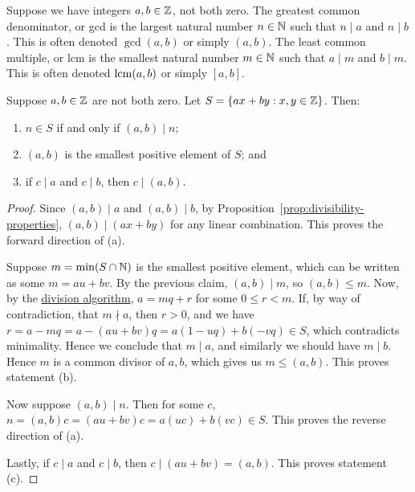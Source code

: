 \begin{definition}
    Suppose we have integers \(a,b \in \mathbb{Z}\), not both zero.
    The greatest common denominator, or gcd
    is the largest natural number \(n \in \mathbb{N}\) such that \(n \mid a\) and \(n \mid b\).
    This is often denoted \(\gcd(a,b)\) or simply \((a,b)\).
    The least common multiple, or lcm
    is the smallest natural number \(m \in \mathbb{N}\) such that \(a \mid m\) and \(b \mid m\).
    This is often denoted \(\operatorname{lcm}(a,b)\) or simply \([a,b]\).
\end{definition}
\begin{theorem}\label{thm:bezout}
    Suppose \(a,b \in \mathbb{Z}\) are not both zero.
    Let \(S = \{ax+by: x,y \in \mathbb{Z}\}\).
    Then:
    \begin{enumerate}[label={(\alph*)}, itemsep=0mm]
        \item \(n \in S\) if and only if \((a,b) \mid n\);
        \item \((a,b)\) is the smallest positive element of \(S\); and
        \item if \(c \mid a\) and \(c \mid b\), then \(c \mid (a,b)\).
    \end{enumerate}
\end{theorem}
\begin{proof}
    Since \((a,b) \mid a\) and \((a,b) \mid b\),
    by Proposition~\ref{prop:divisibility-properties},
    \((a,b) \mid (ax+by)\) for any linear combination.
    This proves the forward direction of (a).
    
    Suppose \(m = \min(S \cap \mathbb{N})\) is the smallest positive element,
    which can be written as some \(m = au+bv\).
    By the previous claim, \((a,b) \mid m\), so \((a,b) \leq m\).
    Now, by the \hyperref[thm:division]{division algorithm},
    \(a = mq + r\) for some \(0 \leq r < m\).
    If, by way of contradiction, that \(m \nmid a\), then \(r > 0\),
    and we have \(r = a-mq = a - (au+bv)q = a(1-uq) + b(-vq) \in S\),
    which contradicts minimality.
    Hence we conclude that \(m \mid a\),
    and similarly we should have \(m \mid b\).
    Hence \(m\) is a common divisor of \(a,b\),
    which gives us \(m \leq (a,b)\).
    This proves statement (b).

    Now suppose \((a,b) \mid n\).
    Then for some \(c\), \(n = (a,b)c = (au+bv)c = a(uc) + b(vc) \in S\).
    This proves the reverse direction of (a).

    Lastly, if \(c \mid a\) and \(c \mid b\), then \(c \mid (au+bv) = (a,b)\).
    This proves statement (c).
\end{proof}

